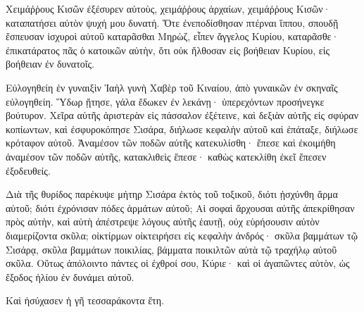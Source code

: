 {Χειμάῤῥους Κισῶν ἐξέσυρεν αὐτοὺς, χειμάῤῥους ἀρχαίων, χειμάῤῥους Κισῶν· καταπατήσει αὐτὸν ψυχή μου δυνατή.
Ὅτε ἐνεποδίσθησαν πτέρναι ἵππου, σπουδῇ ἔσπευσαν ἰσχυροὶ αὐτοῦ
καταρᾶσθαι Μηρὼζ, εἶπεν ἄγγελος Κυρίου, καταρᾶσθε· ἐπικατάρατος πᾶς ὁ κατοικῶν αὐτὴν, ὅτι οὐκ ἤλθοσαν εἰς βοήθειαν Κυρίου, εἰς βοήθειαν ἐν δυνατοῖς.
\par }{\PP {}Εὐλογηθείη ἐν γυναιξὶν Ἰαὴλ γυνὴ Χαβὲρ τοῦ Κιναίου, ἀπὸ γυναικῶν ἐν σκηναῖς εὐλογηθείη.
Ὕδωρ ᾔτησε, γάλα ἔδωκεν ἐν λεκάνῃ· ὑπερεχόντων προσήνεγκε βούτυρον.
Χεῖρα αὐτῆς ἀριστερὰν εἰς πάσσαλον ἐξέτεινε, καὶ δεξιὰν αὐτῆς εἰς σφύραν κοπίωντων, καὶ ἐσφυροκόπησε Σισάρα, διήλωσε κεφαλὴν αὐτοῦ καὶ ἐπάταξε, διήλωσε κρόταφον αὐτοῦ.
Ἀναμέσον τῶν ποδῶν αὐτῆς κατεκυλίσθη· ἔπεσε καὶ ἐκοιμήθη ἀναμέσον τῶν ποδῶν αὐτῆς, κατακλιθεὶς ἔπεσε· καθὼς κατεκλίθη ἐκεῖ ἔπεσεν ἐξοδευθείς.
\par }{\PP {}Διὰ τῆς θυρίδος παρέκυψε μήτηρ Σισάρα ἐκτὸς τοῦ τοξικοῦ, διότι ᾐσχύνθη ἅρμα αὐτοῦ; διότι ἐχρόνισαν πόδες ἁρμάτων αὐτοῦ;
Αἱ σοφαὶ ἄρχουσαι αὐτῆς ἀπεκρίθησαν πρὸς αὐτὴν, καὶ αὐτὴ ἀπέστρεψε λόγους αὐτῆς ἑαυτῇ,
οὐχ εὑρήσουσιν αὐτὸν διαμερίζοντα σκῦλα; οἰκτίρμων οἰκτειρήσει εἰς κεφαλὴν ἀνδρός· σκῦλα βαμμάτων τῷ Σισάρᾳ, σκῦλα βαμμάτων ποικιλίας, βάμματα ποικιλτῶν αὐτὰ τῷ τραχήλῳ αὐτοῦ σκῦλα.
Οὕτως ἀπόλοιντο πάντες οἱ ἐχθροί σου, Κύριε· καὶ οἱ ἀγαπῶντες αὐτὸν, ὡς ἔξοδος ἡλίου ἐν δυνάμει αὐτοῦ.
\par }{\PP Καὶ ἡσύχασεν ἡ γῆ τεσσαράκοντα ἔτη.

}
